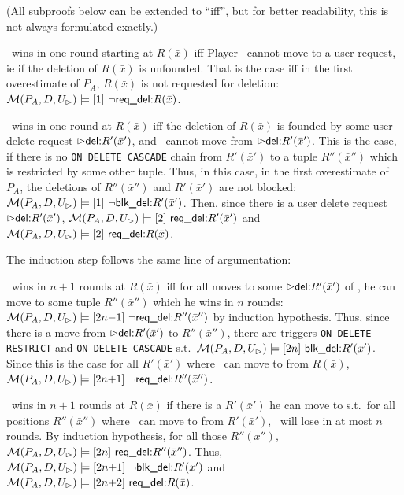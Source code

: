 \documentclass[twoside,11pt]{article}
\theoremstyle{plain}
\def\rdel{\itorsf{req\_del:}}
\def\bdel{\itorsf{blk\_del:}}
\begin{document}
\begin{Proof}
  (All subproofs below can be extended to ``iff'', but for better
  readability, this is not always formulated exactly.)  

   \II\ wins in one round starting at $R(\bar x)$ iff Player \I\ 
  cannot move to a user request, ie if the deletion of
  $R(\bar x)$ is unfounded. That is the case iff in the first
  overestimate of $P_A$, $R(\bar x)$ is not requested for deletion:
  $\pl M(P_A,D,U_\rhd) \models \sterm{1}\ \neg \rdel R(\bar x)$.

  \I\ wins in one round at $R(\bar x)$ iff the deletion of 
 $R(\bar x)$ is founded by some user delete request 
 $\extev \del R'(\bar x')$, and  \II\ cannot move from
 $\extev \del R'(\bar x')$. This is the case, if there is no \texttt{ON
   DELETE CASCADE} chain from $R'(\bar x')$ to a tuple $R''(\bar x'')$
 which is restricted by some other tuple.
 Thus, in this case, in the first overestimate of $P_A$, the
 deletions of $R''(\bar x'')$ and $R'(\bar x')$ are not blocked:
 $\pl M(P_A,D,U_\rhd) \models \sterm{1}\ \neg \bdel R'(\bar x')$.
 Then, since there is a user delete request $\extev \del R'(\bar x')$,
 $\pl M(P_A,D,U_\rhd) \models \sterm{2}\ \rdel R'(\bar x')$ and
 $\pl M(P_A,D,U_\rhd) \models \sterm{2}\ \rdel R(\bar x)$.

 The induction step follows the same line of argumentation: 
 
 \II\ wins in $n{+}1$ rounds at $R(\bar x)$ iff for all moves to some
 $\extev \del R'(\bar x')$ of \I, he can move to some tuple $R''(\bar
 x'')$ which he wins in $n$ rounds: $\pl M(P_A,D,U_\rhd) \models
 \sterm{2n{-}1}\ \neg \rdel R''(\bar x'')$ by induction hypothesis.
 Thus, since there is a move from $\extev \del R'(\bar x')$ to $R''(\bar x'')$,
 there are triggers \texttt{ON DELETE RESTRICT} and \texttt{ON DELETE
   CASCADE} s.t.\ $\pl M(P_A,D,U_\rhd) \models \sterm{2n}\ \bdel
 R'(\bar x')$.  Since this is the case for all $R'(\bar x')$ where \I\ 
 can move to from $R(\bar x)$, $\pl M(P_A,D,U_\rhd) \models
 \sterm{2n{+}1}\ \neg \rdel R''(\bar x'')$.

  \I\ wins in $n{+}1$ rounds at $R(\bar x)$ if there is a
 $R'(\bar x')$ he can move to s.t.\ for all positions $R''(\bar x'')$
  where  \II\ can move to from $R'(\bar x')$,  \II\ will lose
 in at most $n$ rounds.
 By induction hypothesis, for all those $R''(\bar x'')$,
 $\pl M(P_A,D,U_\rhd) \models \sterm{2n}\ \rdel R''(\bar x'')$.
 Thus,
 $\pl M(P_A,D,U_\rhd) \models \sterm{2n{+}1}\ \neg \bdel R'(\bar x')$
 and
 $\pl M(P_A,D,U_\rhd) \models \sterm{2n{+}2}\ \rdel R(\bar x)$.
\end{Proof}
\end{document}
